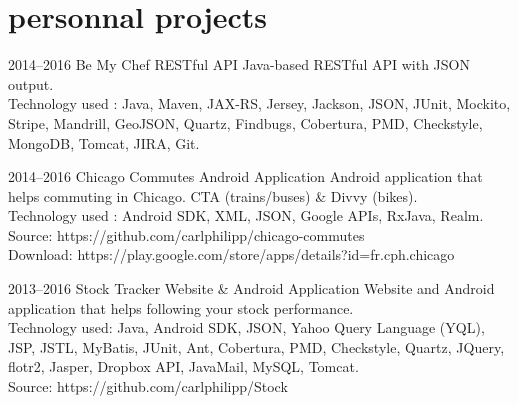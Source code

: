 \documentclass[]{friggeri-cv} %
\begin{document}

\section{personnal projects}

\begin{entrylist}

\entry
{2014--2016}
{Be My Chef}
{RESTful API}
{}
{Java-based RESTful API with JSON output.\\
Technology used : Java, Maven, JAX-RS, Jersey, Jackson, JSON, JUnit, Mockito, Stripe, Mandrill, GeoJSON, Quartz, Findbugs, Cobertura, PMD, Checkstyle, MongoDB, Tomcat, JIRA, Git.}

\end{entrylist}

\begin{entrylist}

\entry
{2014--2016}
{Chicago Commutes}
{Android Application}
{}
{Android application that helps commuting in Chicago. CTA (trains/buses) \& Divvy (bikes).\\
Technology used : Android SDK, XML, JSON, Google APIs, RxJava, Realm.\\
\footnotesize{Source: https://github.com/carlphilipp/chicago-commutes}\\
\footnotesize{Download: https://play.google.com/store/apps/details?id=fr.cph.chicago}}

\end{entrylist}

\begin{entrylist}

\entry
{2013--2016}
{Stock Tracker}
{Website \& Android Application}
{}
{Website and Android application that helps following your stock performance.\\
Technology used: Java, Android SDK, JSON, Yahoo Query Language (YQL), JSP, JSTL, MyBatis,
JUnit, Ant, Cobertura, PMD, Checkstyle, Quartz, JQuery, flotr2, Jasper, Dropbox API, JavaMail,
MySQL, Tomcat.\\
\footnotesize{Source: https://github.com/carlphilipp/Stock}}

\end{entrylist}

\end{document}
